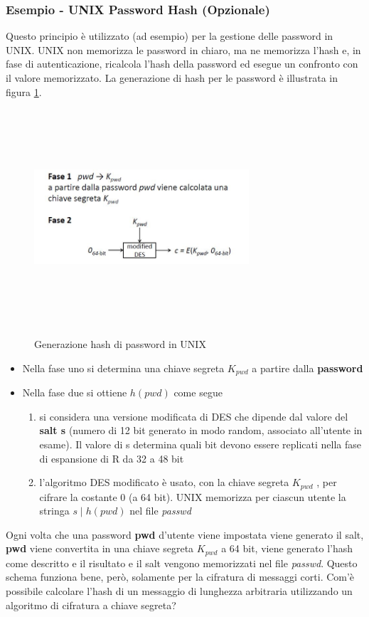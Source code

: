 \subsubsection{Esempio - UNIX Password Hash (Opzionale)}
Questo principio è utilizzato (ad esempio) per la gestione delle password in UNIX. UNIX non memorizza le password in chiaro, ma ne memorizza l'hash e, in fase di autenticazione, ricalcola l'hash della password ed esegue un confronto con il valore memorizzato. La generazione di hash per le password è illustrata in figura \ref{fig:pass_hash}.
\begin{figure}
	\begin{center}
	{\includegraphics[height=8cm, width=8cm, keepaspectratio]{Immagini/hash/schema_des_come_hash.JPG}}
	\caption{Generazione hash di password in UNIX \label{fig:pass_hash}}
	\end{center}
\end{figure}
\begin{itemize}
\item Nella fase uno si determina una chiave segreta $K_{pwd}$ a partire dalla \textbf{password}
\item Nella fase due si ottiene $h(pwd)$ come segue
\begin{enumerate}
	\item si considera una versione modificata di DES che dipende dal valore del \textbf{salt s} (numero di 12 bit generato in modo random, associato all'utente in esame). Il valore di s determina quali bit devono essere replicati nella fase di espansione di R da 32 a 48 bit
	\item l'algoritmo DES modificato è usato, con la chiave segreta $K_{pwd}$ , per cifrare la costante 0 (a 64 bit). UNIX memorizza per ciascun utente la stringa $s \mid h(pwd)$ nel file \textit{passwd}
\end{enumerate}
\end{itemize}
Ogni volta che una password \textbf{pwd} d'utente viene impostata viene generato il salt, \textbf{pwd} viene convertita in una chiave segreta $K_{pwd}$ a 64 bit, viene generato l'hash come descritto e il risultato e il salt vengono memorizzati nel file \textit{passwd}.
\newline \newline
Questo schema funziona bene, però, solamente per la cifratura di messaggi corti. Com'è possibile calcolare l'hash di un messaggio di lunghezza arbitraria utilizzando un algoritmo di cifratura a chiave segreta?


